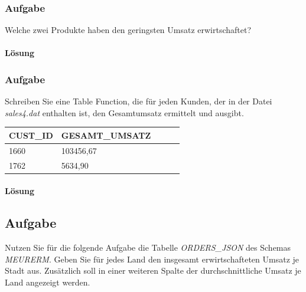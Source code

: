 \subsubsection{Aufgabe}
\label{subsec:uebung_12.aufgabe_01d}
Welche zwei Produkte haben den geringsten Umsatz erwirtschaftet?

\paragraph{Lösung}
\label{subsubsec:uebung_12.aufgabe_01d.loesung}


\subsubsection{Aufgabe}
\label{subsec:uebung_12.aufgabe_01e}
Schreiben Sie eine Table Function, die für jeden Kunden, der in der Datei \textit{sales4.dat} enthalten ist, den Gesamtumsatz ermittelt und ausgibt.

\begin{table}[H]
  \centering
  \ttfamily
  \begin{tabular}{|l|l|l|l|l|}
    \hline
    \textbf{CUST\_ID} & \textbf{GESAMT\_UMSATZ} \\
    \hline
    1660              & 103456,67 \\
    1762              & 5634,90 \\
    \hline
  \end{tabular}
\end{table}

\paragraph{Lösung}
\label{subsubsec:uebung_12.aufgabe_01e.loesung}


\subsection{Aufgabe}
\label{subsec:uebung_12.aufgabe_02}
Nutzen Sie für die folgende Aufgabe die Tabelle \textit{ORDERS\_JSON} des Schemas \textit{MEURERM}. Geben Sie für jedes Land den insgesamt erwirtschafteten Umsatz je Stadt aus. Zusätzlich soll in einer weiteren Spalte der durchschnittliche Umsatz je Land angezeigt werden.

